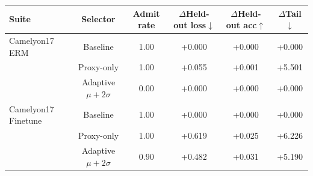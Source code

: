 \begin{tabular}{lccccc}
  \toprule
  Suite & Selector & Admit rate & $\Delta$Held-out loss$\downarrow$ & $\Delta$Held-out acc$\uparrow$ & $\Delta$Tail$\downarrow$ \\
  \midrule
  Camelyon17 ERM & Baseline & 1.00 & +0.000 & +0.000 & +0.000 \\
   & Proxy-only & 1.00 & +0.055 & +0.001 & +5.501 \\
   & Adaptive $\mu+2\sigma$ & 0.00 & +0.000 & +0.000 & +0.000 \\
  Camelyon17 Finetune & Baseline & 1.00 & +0.000 & +0.000 & +0.000 \\
   & Proxy-only & 1.00 & +0.619 & +0.025 & +6.226 \\
   & Adaptive $\mu+2\sigma$ & 0.90 & +0.482 & +0.031 & +5.190 \\
  \bottomrule
\end{tabular}
